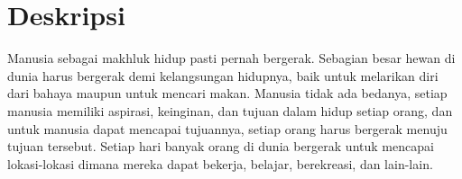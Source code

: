 \documentclass[a4paper,twoside]{article}
\begin{document}
	
	\title{\@judultopik}
	\author{\nama \textendash \@npm} 
	
	\newcommand{\nama}{Vince Farrel Natanael}
	\newcommand{\@npm}{6182301024}
	\newcommand{\@judultopik}{Penerapan MA-Stat-DSM pada Pertandingan Basket} %
	\newcommand{\jumpemb}{1} %
	\newcommand{\pembimbing}{Lionov, Ph.D.}
	\newcommand{\tanggal}{22/09/2026}
	
	
	\maketitle
	
	
	\section{Deskripsi}

	
	
	
	
	
	Manusia sebagai makhluk hidup pasti pernah bergerak.
	Sebagian besar hewan di dunia harus bergerak demi kelangsungan hidupnya, baik untuk melarikan diri dari bahaya maupun untuk mencari makan.
	Manusia tidak ada bedanya, setiap manusia memiliki aspirasi, keinginan, dan tujuan dalam hidup setiap orang, dan untuk manusia dapat mencapai tujuannya, setiap orang harus bergerak menuju tujuan tersebut.
	Setiap hari banyak orang di dunia bergerak untuk mencapai lokasi-lokasi dimana mereka dapat bekerja, belajar, berekreasi, dan lain-lain.
	
\end{document}
